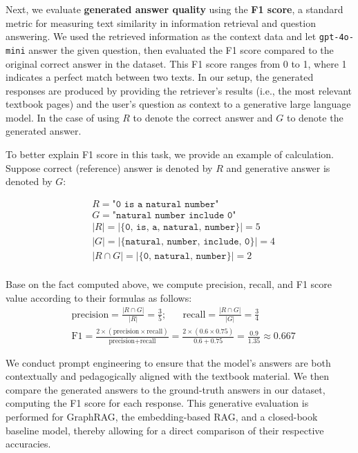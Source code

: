 \documentclass[runningheads]{llncs}
\begin{document}
Next, we evaluate \textbf{generated answer quality} using the \textbf{F1 score}, a standard metric for measuring text similarity in information retrieval and question answering. We used the retrieved information as the context data and let \texttt{gpt-4o-mini} answer the given question, then evaluated the F1 score compared to the original correct answer in the dataset. This F1 score ranges from 0 to 1, where 1 indicates a perfect match between two texts. In our setup, the generated responses are produced by providing the retriever’s results (i.e., the most relevant textbook pages) and the user’s question as context to a generative large language model. In the case of using $R$ to denote the correct answer and $G$ to denote the generated answer. 

To better explain F1 score in this task, we provide an example of calculation. Suppose correct (reference) answer is denoted by $R$ and generative answer is denoted by $G$:

$$\begin{aligned}
    &R = \texttt{"0 is a natural number"}\\
    &G = \texttt{"natural number include 0"}\\
    & |R| = |\{\texttt{0, is, a, natural, number}\}| = 5\\
    & |G| = |\{\texttt{natural, number, include, 0}\}| = 4\\
    & |R \cap G| = |\{\texttt{0, natural, number}\}| = 2\\
\end{aligned}$$

Base on the fact computed above, we compute precision, recall, and F1 score value according to their formulas as follows: 
$$\begin{aligned}
    & \text{precision} = \frac{|R \cap G|}{|R|} = \frac{3}{5};\;\;\;\;\;\;\text{recall} = \frac{|R \cap G|}{|G|} = \frac{3}{4}\\
    & \text{F1} = \frac{2 \times (\textrm{precision} \times \textrm{recall})}{\textrm{precision} + \textrm{recall}} = \frac{2 \times (0.6 \times 0.75)}{0.6 + 0.75} = \frac{0.9}{1.35} \approx 0.667
\end{aligned}$$

We conduct prompt engineering to ensure that the model's answers are both contextually and pedagogically aligned with the textbook material. We then compare the generated answers to the ground-truth answers in our dataset, computing the F1 score for each response. This generative evaluation is performed for GraphRAG, the embedding-based RAG, and a closed-book baseline model, thereby allowing for a direct comparison of their respective accuracies.
\end{document}
